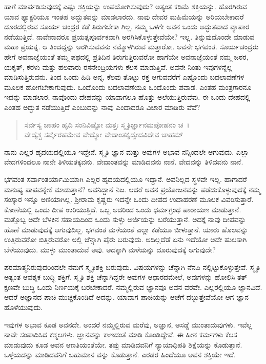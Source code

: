ಹಾಗೆ ಮಾರ್ಪಡಿಸುವುದಕ್ಕೆ ಎಷ್ಟು ಶಕ್ತಿಯನ್ನು ಉಪಯೋಗಿಸುವುದು? ಅತ್ಯಂತ ಕಡಿಮೆ ಶಕ್ತಿಯನ್ನು. ಹೊರಗಿರುವ ಯಾವ ಫ್ಯಾಕ್ಟರಿಯೂ ಇಂತಹ ಅದ್ಭುತವನ್ನು ಮಾಡಲಾರದು. ನಾವು ದೇವರ ಮಹಿಮೆಯನ್ನು ಅರಿಯಬೇಕಾದರೆ ದೂರದಲ್ಲಿರುವ ಸೂರ್ಯ ಚಂದ್ರರ ಕಡೆ ತಿರುಗಬೇಕಾ ಗಿಲ್ಲ. ನಮ್ಮ ಒಳಗೇ ಅವನ ಒಂದು ಅದ್ಭುತವಾದ ವ್ಯಾಪಾರ ನಡೆಯುತ್ತಿದೆ. ನಾವೇನಾದರೂ ಪ್ರಯತ್ನಪೂರ್ವಕವಾಗಿ ಅರಗಿಸಿಕೊಳ್ಳುತ್ತೇವೆಯೇ? ಇಲ್ಲ. ತಿನ್ನುವುದೊಂದೇ ಮಾಡುವ ಮಹಾ ಪ್ರಯತ್ನ. ಆ ತಿಂದದ್ದನ್ನು ಅರಗಿಸುವವನು ನಮ್ಮೊಳಗಿರುವ ಮತ್ತಾರೋ. ಅವನೇ ಭಗವಂತ. ಸೂರ್ಯಚಂದ್ರರು ಹೇಗೆ ಅವನಾಜ್ಞೆಯಂತೆ ತಮ್ಮ ಪಥದಲ್ಲಿ ಪ್ರತಿದಿನ ತಿರುಗುತ್ತಿರುವರೋ ಹಾಗೆಯೇ ಅವನಾಜ್ಞೆಯಂತೆ ನಮ್ಮ ಜಠರ, ಯಕೃತ್, ಕರಳು ಮತ್ತು ಹಲವಾರು ರಸನೇಂದ್ರಿಯಗಳು ಕೆಲಸ ಮಾಡುತ್ತಿವೆ. ಅವನೇ ನಿಂತು ಇವುಗಳನ್ನೆಲ್ಲ ಮಾಡಿಸುತ್ತಿರುವನು. ತಿಂದ ಒಂದು ಹಿಡಿ ಅನ್ನ, ಕೆಲವು ತೊಟ್ಟು ರಕ್ತ ಆಗುವವರೆಗೆ ಎಷ್ಟೊಂದು ಬದಲಾವಣೆಗಳ ಮೂಲಕ ಹೋಗಬೇಕಾಗುವುದು. ಒಂದೊಂದು ಬದಲಾವಣೆಯೂ ಒಂದೊಂದು ಪವಾಡ. ಎಂತಹ ಮಂತ್ರಗಾರನೂ ಇದನ್ನು ಮಾಡಲಾರ; ನಾವೊಂದು ದೇಹವನ್ನು ಯಾವಾಗಲೂ ಹೊತ್ತು ಅಲೆಯುತ್ತಿರುವೆವು. ಈ ಒಂದು ದೇಹದಲ್ಲಿ ಎಂತಹ ಅದ್ಭುತ ನಡೆಯುತ್ತಿದೆ ಎಂಬುದನ್ನು ನಾವು ಎಂದಾದರೂ ವಿಚಾರ ಮಾಡಿರು ವೆವೆ?

\begin{verse}
ಸರ್ವಸ್ಯ ಚಾಹಂ ಹೃದಿ ಸಂನಿವಿಷ್ಟೋ ಮತ್ತಃ ಸ್ಮೃತಿರ್ಜ್ಞಾನಮಪೋಹನಂ ಚ~।\\ವೇದೈಶ್ಚ ಸರ್ವೈರಹಮೇವ ವೇದ್ಯೋ ವೇದಾಂತಕೃದ್ವೇದವಿದೇವ ಚಾಹಮ್ 
\end{verse}

{\small ನಾನು ಎಲ್ಲರ ಹೃದಯದಲ್ಲಿಯೂ ಇದ್ದೇನೆ. ಸ್ಮೃತಿ ಜ್ಞಾನ ಮತ್ತು ಅವುಗಳ ಅಭಾವ ನನ್ನಿಂದಲೇ ಆಗುವುದು. ಎಲ್ಲಾ ವೇದಗಳಿಂದಲೂ ನಾನೇ ತಿಳಿಯತಕ್ಕವನು. ವೇದಾಂತವನ್ನು ಮಾಡಿದವನು ನಾನೆ. ವೇದವನ್ನು ತಿಳಿದವನು ನಾನೆ.}

ಭಗವಂತ ಸರ್ವಾಂತರ್ಯಾಮಿಯಾಗಿ ಎಲ್ಲರ ಹೃದಯದಲ್ಲಿಯೂ ಇದ್ದಾನೆ. ಅವನಿಲ್ಲದ ಸ್ಥಳವೇ ಇಲ್ಲ. ಹಾಗಾದರೆ ಮನುಷ್ಯ ಪಾಪವನ್ನೇಕೆ ಮಾಡುತ್ತಾನೆ? ಅವನಿದ್ದಾನೆ ನಿಜ. ಆದರೆ ಅವನ ಪ್ರಯೋಜನವನ್ನು ಪಡೆದುಕೊಳ್ಳುವುದಕ್ಕೆ ನಮ್ಮ ಸಂಸ್ಕಾರ ಇನ್ನೂ ಅಣಿಯಾಗಿಲ್ಲ. ಶ‍್ರೀರಾಮ ಕೃಷ್ಣರು ಇದನ್ನೇ ಒಂದು ದೀಪದ ಉದಾಹರಣೆ ಮೂಲಕ ವಿವರಿಸುತ್ತಾರೆ. ಕೋಣೆಯಲ್ಲಿ ಒಂದು ದೀಪ ಉರಿಯುತ್ತಿದೆ. ಒಬ್ಬ ಅದರಿಂದ ಒಂದು ಧರ್ಮಗ್ರಂಥ ಪಾರಾಯಣ ಮಾಡುತ್ತಾನೆ. ಮತ್ತೊಬ್ಬ ಅದೇ ಬೆಳಕಿನ ಸಹಾಯದಿಂದ ಒಂದು ಸುಳ್ಳು ಅರ್ಜಿಯನ್ನು ಬರೆಯುತ್ತಾನೆ. ಅದಕ್ಕೆ ನಾವು ದೀಪವನ್ನು ಹೊಣೆ ಮಾಡುವುದಕ್ಕೆ ಆಗುವುದಿಲ್ಲ. ಭಗವಂತ ಮಳೆಯಂತೆ ಎಲ್ಲಾ ಕಡೆಯೂ ಬೀಳುತ್ತಾನೆ. ಯಾರು ಹೊಲವನ್ನು ಉತ್ತಿರುವರೋ ಬಿತ್ತಿರುವರೋ ಅಲ್ಲಿ ಚೆನ್ನಾಗಿ ಪೈರು ಬರುವುದು. ಅದಿಲ್ಲದೆಡೆ ಏನು ಇದೆಯೋ ಅದೇ ಹುಲಸಾಗಿ ಬೆಳೆಯುವುದು. ಮುಳ್ಳು ಮುಂತಾದುವೆ ಅವು. ಅದಕ್ಕಾಗಿ ಮಳೆಯನ್ನು ದೂರುವುದಕ್ಕೆ ಆಗುವುದೇ?

ಪರಮಾತ್ಮನಿರುವುದರಿಂದಲೇ ನಮಗೆ ಸ್ಮೃತಿಶಕ್ತಿ ಬರುವುದು. ವಿಷಯಗಳನ್ನು ಚೆನ್ನಾಗಿ ನೆನಪಿ ನಲ್ಲಿಟ್ಟುಕೊಳ್ಳುತ್ತೇವೆ. ಸ್ಮೃತಿ ಅತ್ಯಂತ ಆವಶ್ಯಕ ಬುದ್ಧಿ ಶಕ್ತಿಗೆ. ಸ್ಮೃತಿ ಶಕ್ತಿ ಚೆನ್ನಾಗಿದ್ದರೇ ಅವುಗಳ ಆಧಾರದಮೇಲೆ, ಅವುಗಳನ್ನು ಹೋಲಿಸಿ ತತ್​ಕ್ಷಣವೇ ಬುದ್ಧಿ ಒಂದು ನಿರ್ಣಯಕ್ಕೆ ಬರಬೇಕಾದರೆ. ನಮ್ಮಲ್ಲಿರುವ ಜ್ಞಾನವೂ ಅವನ ವರವೇ. ಎಲ್ಲರಲ್ಲಿಯೂ ಜ್ಞಾನವಿದೆ. ಆದರೆ ಅಜ್ಞಾನದ ಪಾಚಿ ಮುಚ್ಚಿಕೊಂಡಿದೆ ಅದನ್ನು. ಯಾವಾಗ ಪಾಚಿಯನ್ನು ಆಚೆಗೆ ದಬ್ಬುತ್ತೇವೆಯೋ ಆಗ ಜ್ಞಾನ ಹೊಳೆಯುವುದು.

ಇವುಗಳ ಅಭಾವ ಕೂಡ ಅವನದೇ. ಅಂದರೆ ನಮ್ಮಲ್ಲಿರುವ ಮರೆವು, ಅಜ್ಞಾನ, ಅಸಡ್ಡೆ ಮುಂತಾದುವುಗಳು. ಇವೆಲ್ಲ ನಾವೇ ಸಂಪಾದಿಸಿದ ಕಶ್ಮಲಗಳು. ಜ್ಞಾನವನ್ನು ಕಾಣದಂತೆ ಮಾಡಿ ಕೊಂಡಿದ್ದೇವೆ. ಈ ಹೀನ ಕರ್ಮಗಳು ಕೆಲಸ ಮಾಡುವುದು ಕೂಡ ಅವನ ಆಣತಿಯಂತೆಯೇ. ತಪ್ಪು ಮಾಡಿದವನಿಗೆ ನ್ಯಾಯಾಧಿಪತಿ ಶಿಕ್ಷೆಯನ್ನು ಕೊಡುತ್ತಾನೆ. ಒಳ್ಳೆಯದನ್ನು ಮಾಡಿದವನಿಗೆ ಬಹುಮಾನ ವನ್ನು ಕೊಡುತ್ತಾನೆ. ಎರಡರ ಹಿಂದೆಯೂ ಅವನ ಶಕ್ತಿಯೇ ಇದೆ.

